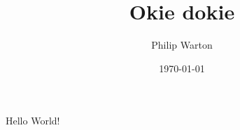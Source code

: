 \documentclass{article}
\begin{document}
\title{Okie dokie}
\author{Philip Warton}
\date{\today}
\maketitle
Hello World!
\end{document}
